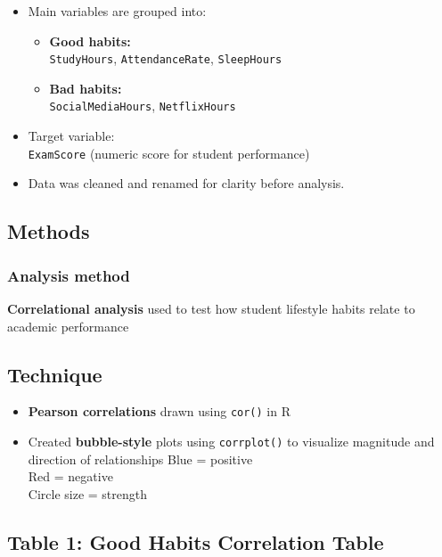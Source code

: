 \documentclass[
  10pt,
  letterpaper,
  DIV=11,
  numbers=noendperiod]{scrartcl}
\providecommand{\tightlist}{%
  \setlength{\itemsep}{0pt}\setlength{\parskip}{0pt}}\usepackage{longtable,booktabs,array}
\begin{document}
\begin{itemize}
\item
  Main variables are grouped into:

  \begin{itemize}
  \tightlist
  \item
    \textbf{Good habits:}\\
    \texttt{StudyHours}, \texttt{AttendanceRate}, \texttt{SleepHours}
  \item
    \textbf{Bad habits:}\\
    \texttt{SocialMediaHours}, \texttt{NetflixHours}
  \end{itemize}
\item
  Target variable:\\
  \texttt{ExamScore} (numeric score for student performance)
\item
  Data was cleaned and renamed for clarity before analysis.
\end{itemize}

\newpage

\subsection{Methods}\label{methods}

\subsubsection{Analysis method}\label{analysis-method}

\textbf{Correlational analysis} used to test how student lifestyle
habits relate to academic performance

\subsection{Technique}\label{technique}

\begin{itemize}
\tightlist
\item
  \textbf{Pearson correlations} drawn using \texttt{cor()} in R
\item
  Created \textbf{bubble-style} plots using \texttt{corrplot()} to
  visualize magnitude and direction of relationships {Blue} = positive\\
  {Red} = negative\\
  Circle size = strength
\end{itemize}

\subsection{Table 1: Good Habits Correlation
Table}\label{table-1-good-habits-correlation-table}
\end{document}
